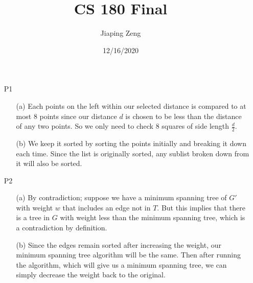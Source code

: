 \documentclass{article}
\title{CS 180 Final}
\author{Jiaping Zeng}
\date{12/16/2020}
\begin{document}

\newpage
\maketitle

\newpage
\begin{itemize}
    \item [P1] \begin{itemize}
              \item [(a)] Each points on the left within our selected distance is compared to at most 8 points since our distance $d$ is chosen to be less than the distance of any two points. So we only need to check 8 squares of side length $\frac{d}{2}$.
              \item [(b)] We keep it sorted by sorting the points initially and breaking it down each time. Since the list is originally sorted, any sublist broken down from it will also be sorted.
          \end{itemize}
\end{itemize}

\newpage
\begin{itemize}
    \item [P2] \begin{itemize}
              \item [(a)] By contradiction; suppose we have a minimum spanning tree of $G'$ with weight $w$ that includes an edge not in $T$. But this implies that there is a tree in $G$ with weight less than the minimum spanning tree, which is a contradiction by definition.
              \item [(b)] Since the edges remain sorted after increasing the weight, our minimum spanning tree algorithm will be the same. Then after running the algorithm, which will give us a minimum spanning tree, we can simply decrease the weight back to the original.
          \end{itemize}
\end{itemize}
\end{document}
